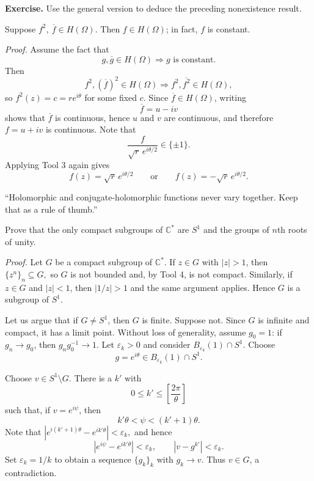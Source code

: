 \documentclass[11pt,a4paper]{article}
\begin{document}
\textbf{Exercise.}
Use the general version to deduce the preceding nonexistence result.


Suppose \(f^2,\ \overline f\in H(\Omega).\)
Then $f\in H(\Omega)$; in fact, $f$ is constant.

\textit{Proof.}
Assume the fact that
\[
g,\overline g\in H(\Omega)\Longrightarrow g\text{ is constant}.
\]
Then
\[
f^2,(\overline f)^2\in H(\Omega)
\Longrightarrow
f^2,\overline{f^2}\in H(\Omega),
\]
so \(f^2(z)=c=re^{i\theta}\)
for some fixed $c$. Since $\overline f\in H(\Omega)$, writing
\[
\overline f=u-iv
\]
shows that $\overline f$ is continuous, hence $u$ and $v$ are continuous, and therefore $f=u+iv$ is continuous. Note that
\[
\frac{f}{\sqrt r\,e^{i\theta/2}}\in\{\pm1\}.
\]
Applying Tool 3 again gives
\[
f(z)=\sqrt r\,e^{i\theta/2}
\qquad\text{or}\qquad
f(z)=-\sqrt r\,e^{i\theta/2}.
\]

``Holomorphic and conjugate-holomorphic functions never vary together. Keep that as a rule of thumb.''

Prove that the only compact subgroups of $\mathbb C^*$ are $S^1$ and the groups of $n$th roots of unity.

\textit{Proof.}
Let $G$ be a compact subgroup of $\mathbb C^*$. If $z\in G$ with $|z|>1$, then \(\{z^n\}_n\subseteq G,\)
so $G$ is not bounded and, by Tool 4, is not compact. Similarly, if $z\in G$ and $|z|<1$, then $|1/z|>1$ and the same argument applies. Hence $G$ is a subgroup of $S^1$.

Let us argue that if $G\neq S^1$, then $G$ is finite. Suppose not. Since $G$ is infinite and compact, it has a limit point. Without loss of generality, assume $g_0=1$: if $g_n\to g_0$, then $g_ng_0^{-1}\to1$. Let $\varepsilon_k>0$ and consider $B_{\varepsilon_k}(1)\cap S^1$. Choose
\[
g=e^{i\theta}\in B_{\varepsilon_k}(1)\cap S^1.
\]


Choose $v\in S^1\setminus G$. There is a $k'$ with
\[
0\leq k'\leq\left[\frac{2\pi}{\theta}\right]
\]
such that, if $v=e^{i\psi}$, then
\[
k'\theta<\psi<(k'+1)\theta.
\]
Note that \(\left|e^{i(k'+1)\theta}-e^{ik'\theta}\right|<\varepsilon_k,\)
and hence
\[
\left|e^{i\psi}-e^{ik'\theta}\right|<\varepsilon_k,
\qquad
|v-g^{k'}|<\varepsilon_k.
\]
Set $\varepsilon_k=1/k$ to obtain a sequence $\{g_k\}_k$ with $g_k\to v$. Thus $v\in G$, a contradiction.
\end{document}
